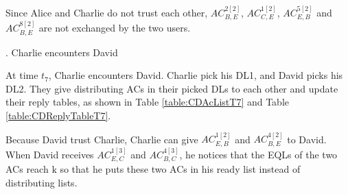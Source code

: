Since Alice and Charlie do not trust each other, ${AC}^{2\left[2\right]}_{B,E}$, ${AC}^{1\left[2\right]}_{C,E}$, ${AC}^{5\left[2\right]}_{E,B}$ and ${AC}^{8\left[2\right]}_{B,E}$ are not exchanged by the two users.

.  Charlie encounters David

At time ${t}_{7}$, Charlie encounters David. Charlie pick his DL1, and David picks his DL2. They give distributing ACs in their picked DLs to each other and update their reply tables, as shown in Table \ref{table:CDAcListT7} and Table \ref{table:CDReplyTableT7}.

Because David trust Charlie, Charlie can give ${AC}^{1\left[2\right]}_{E,B}$ and ${AC}^{4\left[2\right]}_{B,E}$ to David. When David receives ${AC}^{1\left[3\right]}_{E,C}$ and ${AC}^{4\left[3\right]}_{B,C}$, he notices that the EQLs of the two ACs reach $\mathrm{k}$ so that he puts these two ACs in his ready list instead of distributing lists.

